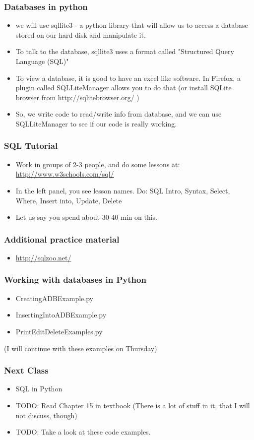 \documentclass{beamer}
\begin{document}
\begin{frame}
\frametitle{Databases in python}
\begin{itemize}
\item we will use sqllite3 - a python library that will allow us to access a database stored on our hard disk and manipulate it.
\item To talk to the database, sqllite3 uses a format called "Structured Query Language (SQL)"  
\item To view a database, it is good to have an excel like software. In Firefox, a plugin called SQLLiteManager allows you to do that (or install SQLite browser from http://sqlitebrowser.org/ )
\item So, we write code to read/write info from database, and we can use SQLLiteManager to see if our code is really working.
\end{itemize}
\end{frame}

\begin{frame}
\frametitle{SQL Tutorial}
\begin{itemize}
\item Work in groups of 2-3 people, and do some lessons at: \url{http://www.w3schools.com/sql/}
\item In the left panel, you see lesson names. Do: SQL Intro, Syntax, Select, Where, Insert into, Update, Delete 
\item Let us say you spend about 30-40 min on this. 
\end{itemize}
\end{frame}

\begin{frame}%
\frametitle{Additional practice material}
\begin{itemize}
\item \url{http://sqlzoo.net/}
\end{itemize}
\end{frame}

\begin{frame}
\frametitle{Working with databases in Python}
\begin{itemize}
\item CreatingADBExample.py
\item InsertingIntoADBExample.py
\item PrintEditDeleteExamples.py
\end{itemize}
(I will continue with these examples on Thursday)
\end{frame}

\begin{frame}
\frametitle{Next Class}
\begin{itemize}
\item SQL in Python
\item TODO: Read Chapter 15 in textbook (There is a  lot of stuff in it, that I will not discuss, though)
\item TODO: Take a look at these code examples.
\end{itemize}
\end{frame}
\end{document}
